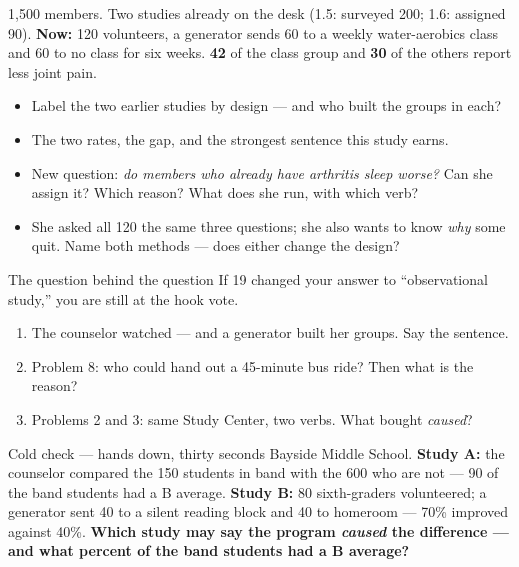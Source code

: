 \documentclass[aspectratio=169, 11pt]{beamer}
\begin{document}
\begin{frame}[t, plain]
  1{,}500 members. Two studies already on the desk (1.5: surveyed 200; 1.6: assigned 90).
  \textbf{Now:} 120 volunteers, a generator sends 60 to a weekly water-aerobics class and 60 to
  no class for six weeks. \textbf{42} of the class group and \textbf{30} of the others report
  less joint pain.
  \begin{itemize}\setlength{\itemsep}{5pt}
    \item[16.] Label the two earlier studies by design --- and who built the groups in each?
    \item[17.] The two rates, the gap, and the strongest sentence this study earns.
    \item[18.] New question: \emph{do members who already have arthritis sleep worse?} Can she
          assign it? Which reason? What does she run, with which verb?
    \item[19.] She asked all 120 the same three questions; she also wants to know \emph{why}
          some quit. Name both methods --- does either change the design?
  \end{itemize}
  \begin{block}{The question behind the question}
    If 19 changed your answer to ``observational study,'' you are still at the hook vote.
  \end{block}
\end{frame}

\begin{frame}[t, plain]
  \vspace{4pt}
  \begin{enumerate}\setlength{\itemsep}{5pt}
    \item The counselor watched --- and a generator built her groups. Say the sentence.
    \item Problem 8: who could hand out a 45-minute bus ride? Then what is the reason?
    \item Problems 2 and 3: same Study Center, two verbs. What bought \emph{caused}?
  \end{enumerate}
  \vspace{6pt}
  \begin{block}{Cold check --- hands down, thirty seconds}
    Bayside Middle School. \textbf{Study A:} the counselor compared the 150 students in band
    with the 600 who are not --- 90 of the band students had a B average. \textbf{Study B:} 80
    sixth-graders volunteered; a generator sent 40 to a silent reading block and 40 to homeroom
    --- 70\% improved against 40\%. \textbf{Which study may say the program \emph{caused} the
    difference --- and what percent of the band students had a B average?}
  \end{block}
\end{frame}
\end{document}
